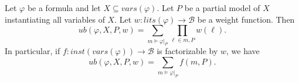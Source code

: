 \documentclass[acmsmall,review]{acmart}\settopmatter{printfolios=true,printccs=false,printacmref=false}
\begin{document}
\begin{corollary}\label{ub invariant for total models}
  Let $\varphi$ be a formula and let $X \subseteq vars(\varphi)$. Let $P$ be a partial model of $X$ instantiating all variables of $X$. Let $w : lits(\varphi) \to \mathcal B$ be a weight function. Then
  \begin{equation}
    ub(\varphi, X, P, w) = \sum_{m \models \varphi|_P} \prod_{\ell \in m, P} w(\ell).
  \end{equation}
  In particular, if $f : inst(vars(\varphi)) \to \mathcal B$ is factorizable by $w$, we have
  \begin{equation}
    ub(\varphi, X, P, w) = \sum_{m \models \varphi|_P} f(m,P).
  \end{equation}
\end{corollary}



% 


\end{document}

